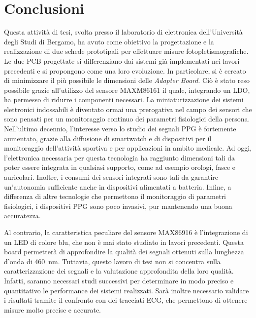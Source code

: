 \documentclass[
	a4paper,
	cleardoublepage=empty,
	headings=twolinechapter,
	numbers=autoenddot,
]{scrbook}
\begin{document}
	\chapter*{Conclusioni}
	Questa attività di tesi, svolta presso il laboratorio di elettronica dell'Università degli Studi di Bergamo, ha avuto come obiettivo la progettazione e la realizzazione di due schede prototipali per effettuare misure fotopletismografiche. Le due PCB progettate si differenziano dai sistemi già implementati nei lavori precedenti e si propongono come una loro evoluzione. In particolare, si è cercato di minimizzare il più possibile le dimensioni delle \textit{Adapter Board}. Ciò è stato reso possibile grazie all'utilizzo del sensore MAXM86161 il quale, integrando un LDO, ha permesso di ridurre i componenti necessari. La miniaturizzazione dei sistemi elettronici indossabili è diventato ormai una prerogativa nel campo dei sensori che sono pensati per un monitoraggio continuo dei parametri fisiologici della persona. Nell'ultimo decennio, l'interesse verso lo studio dei segnali PPG è fortemente aumentato, grazie alla diffusione di smartwatch e di dispositivi per il monitoraggio dell'attività sportiva e per applicazioni in ambito medicale. Ad oggi, l'elettronica necessaria per questa tecnologia ha raggiunto dimensioni tali da poter essere integrata in qualsiasi supporto, come ad esempio orologi, fasce e auricolari. Inoltre, i consumi dei sensori integrati sono tali da garantire un'autonomia sufficiente anche in dispositivi alimentati a batteria.	Infine, a differenza di altre tecnologie che permettono il monitoraggio di parametri fisiologici, i dispositivi PPG sono poco invasivi, pur mantenendo una buona accuratezza.
	
	Al contrario, la caratteristica peculiare del sensore MAX86916 è l'integrazione di un LED di colore blu, che non è mai stato studiato in lavori precedenti. Questa board permetterà di approfondire la qualità dei segnali ottenuti sulla lunghezza d'onda di \SI{460}{\nano\meter}. Tuttavia, questo lavoro di tesi non si concentra sulla caratterizzazione dei segnali e la valutazione approfondita della loro qualità. Infatti, saranno necessari studi successivi per determinare in modo preciso e quantitativo le performance dei sistemi realizzati. Sarà inoltre necessario validare i risultati tramite il confronto con dei tracciati ECG, che permettono di ottenere misure molto precise e accurate.
	
\end{document}
